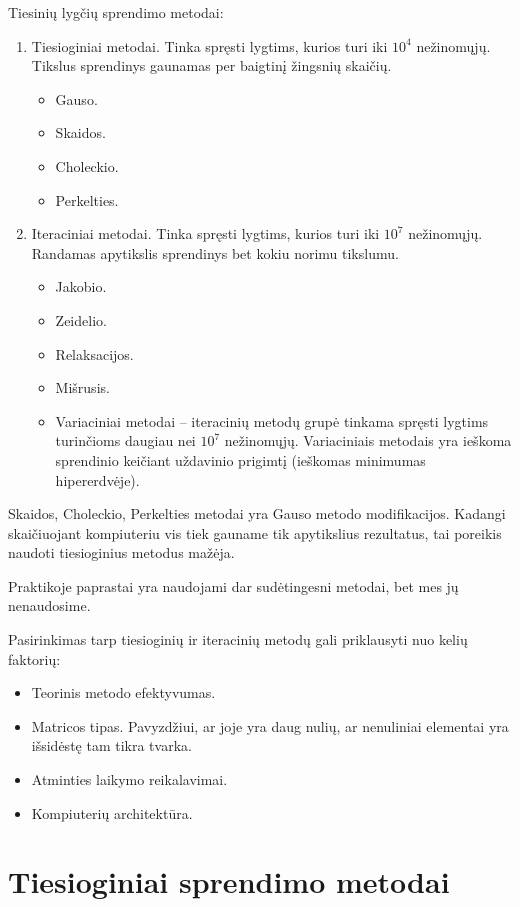 Tiesinių lygčių sprendimo metodai:
\begin{enumerate}
  \item Tiesioginiai metodai. Tinka spręsti lygtims, kurios turi iki $10^{4}$
    nežinomųjų. Tikslus sprendinys gaunamas per baigtinį žingsnių skaičių.
    \begin{itemize}
      \item Gauso.
      \item Skaidos.
      \item Choleckio.
      \item Perkelties.
    \end{itemize}
  \item Iteraciniai metodai. Tinka spręsti lygtims, kurios turi iki $10^{7}$
    nežinomųjų. Randamas apytikslis sprendinys bet kokiu norimu tikslumu.
    \begin{itemize}
      \item Jakobio.
      \item Zeidelio.
      \item Relaksacijos.
      \item Mišrusis.
      \item Variaciniai metodai – iteracinių metodų grupė tinkama spręsti
        lygtims turinčioms daugiau nei $10^{7}$ nežinomųjų. Variaciniais
        metodais yra ieškoma sprendinio keičiant uždavinio prigimtį
        (ieškomas minimumas hipererdvėje).
    \end{itemize}
\end{enumerate}
Skaidos, Choleckio, Perkelties metodai yra Gauso metodo modifikacijos.
Kadangi skaičiuojant kompiuteriu vis tiek gauname tik apytikslius
rezultatus, tai poreikis naudoti tiesioginius metodus mažėja.

Praktikoje paprastai yra naudojami dar sudėtingesni metodai, bet mes
jų nenaudosime.

Pasirinkimas tarp tiesioginių ir iteracinių metodų gali priklausyti nuo
kelių faktorių:
\begin{itemize}
  \item Teorinis metodo efektyvumas.
  \item Matricos tipas. Pavyzdžiui, ar joje yra daug nulių, ar nenuliniai
    elementai yra išsidėstę tam tikra tvarka.
  \item Atminties laikymo reikalavimai.
  \item Kompiuterių architektūra.
\end{itemize}

\section{Tiesioginiai sprendimo metodai}

